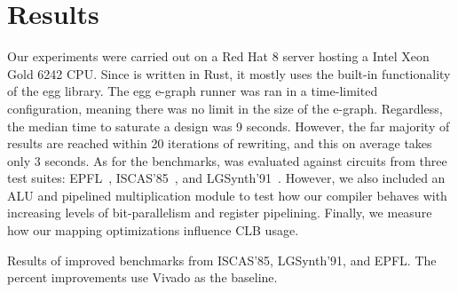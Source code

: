 \section{Results}\label{sec:results}
Our experiments were carried out on a Red Hat 8 server hosting a Intel Xeon
Gold 6242 CPU. Since \shortname{} is written in Rust, it mostly uses the
built-in functionality of the egg library. The egg e-graph runner was ran in a
time-limited configuration, meaning there was no limit in the size of the
e-graph. Regardless, the median time to saturate a design was 9 seconds.
However, the far majority of results are reached within 20 iterations of
rewriting, and this on average takes only 3 seconds. As for the benchmarks,
\shortname{} was evaluated against circuits from three test suites:
EPFL~\cite{epflbench}, ISCAS'85~\cite{iscasbench}, and
LGSynth'91~\cite{lgsynthbench}. However, we also included an ALU and pipelined
multiplication module to test how our compiler behaves with increasing levels
of bit-parallelism and register pipelining. Finally, we measure how our mapping
optimizations influence CLB usage.

\begin{table}
    \centering
    \caption{Results of \nimproved{} improved benchmarks from ISCAS'85, LGSynth'91, and EPFL. The percent improvements use Vivado as the baseline.}\label{tab:results}
\end{table}

